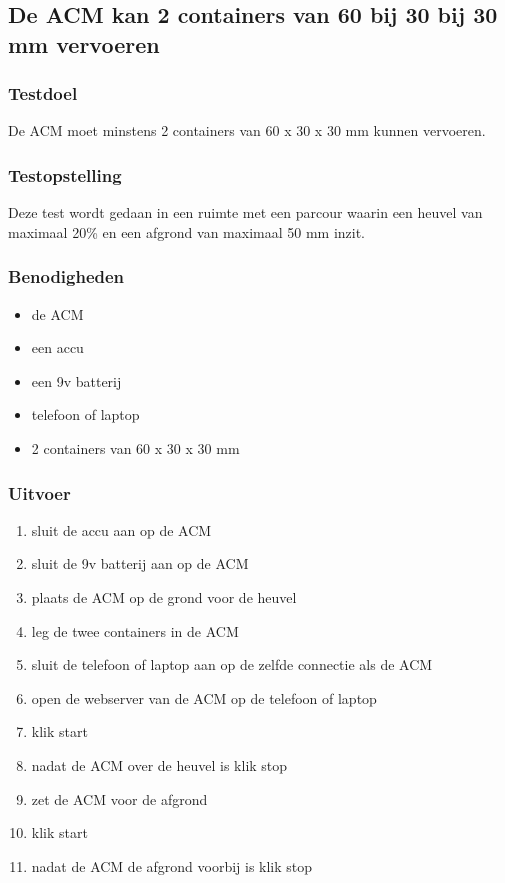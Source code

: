 \subsection{De ACM kan 2 containers van 60 bij 30 bij 30 mm vervoeren}
\subsubsection{Testdoel}
\begin{flushleft}
    De ACM moet minstens 2 containers van 60 x 30 x 30 mm kunnen vervoeren.
\end{flushleft}
\subsubsection{Testopstelling}
\begin{flushleft}
    Deze test wordt gedaan in een ruimte met een parcour waarin een heuvel van maximaal 20\% en een afgrond van maximaal 50 mm inzit.
\end{flushleft}
\subsubsection{Benodigheden}

\begin{itemize}
    \item de ACM
    \item een accu
    \item een 9v batterij
    \item telefoon of laptop
    \item 2 containers van 60 x 30 x 30 mm
\end{itemize}
\subsubsection{Uitvoer}
\begin{enumerate}
    \item sluit de accu aan op de ACM
    \item sluit de 9v batterij aan op de ACM
    \item plaats de ACM op de grond voor de heuvel
    \item leg de twee containers in de ACM
    \item sluit de telefoon of laptop aan op de zelfde connectie als de ACM
    \item open de webserver van de ACM op de telefoon of laptop
    \item klik start
    \item nadat de ACM over de heuvel is klik stop
    \item zet de ACM voor de afgrond
    \item klik start
    \item nadat de ACM de afgrond voorbij is klik stop
\end{enumerate}
